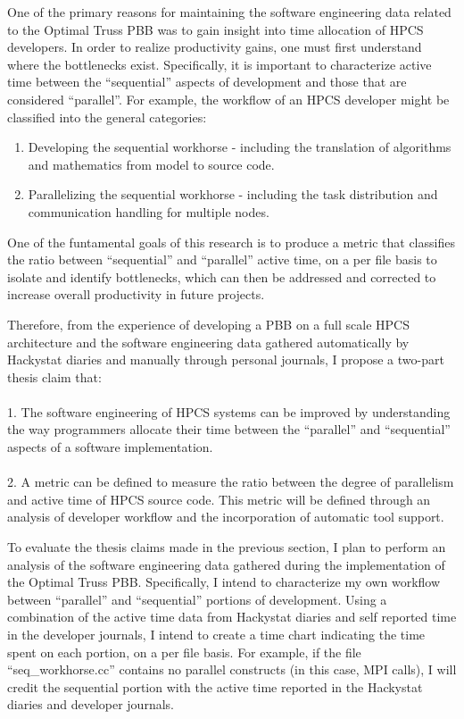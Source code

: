 \documentclass[11pt,twocolumn]{article}
\begin{document}
One of the primary reasons for maintaining the software engineering
data related to the Optimal Truss PBB was to gain insight into time
allocation of HPCS developers.  In order to realize productivity
gains, one must first understand where the bottlenecks exist.
Specifically, it is important to characterize active time between the
``sequential'' aspects of development and those that are considered
``parallel''.  For example, the workflow of an HPCS developer might be
classified into the general categories:

\begin{enumerate}
  \item Developing the sequential workhorse - including the translation of
algorithms and mathematics from model to source code.
  \item Parallelizing the sequential workhorse - including the task
distribution and communication handling for multiple nodes.
\end{enumerate}

One of the funtamental goals of this research is to produce a metric
that classifies the ratio between ``sequential'' and ``parallel''
active time, on a per file basis to isolate and identify bottlenecks,
which can then be addressed and corrected to increase overall
productivity in future projects.

Therefore, from the experience of developing a PBB on a full scale HPCS
architecture and the software engineering data gathered automatically
by Hackystat diaries and manually through personal journals, I propose
a two-part thesis claim that:
\\
\\
1. The software engineering of HPCS systems can be improved by
understanding the way programmers allocate their time between the
``parallel'' and ``sequential'' aspects of a software implementation.
\\
\\
2. A metric can be defined to measure the ratio between the degree of
parallelism and active time of HPCS source code.  This metric will be
defined through an analysis of developer workflow and the
incorporation of automatic tool support.

\label{sec:methodology}

To evaluate the thesis claims made in the previous section, I plan to
perform an analysis of the software engineering data gathered during
the implementation of the Optimal Truss PBB.  Specifically, I intend
to characterize my own workflow between ``parallel'' and
``sequential'' portions of development.  Using a combination of the
active time data from Hackystat diaries and self reported time in the
developer journals, I intend to create a time chart indicating the
time spent on each portion, on a per file basis.  For example, if the
file ``seq\_workhorse.cc'' contains no parallel constructs (in this
case, MPI calls), I will credit the sequential portion with the active
time reported in the Hackystat diaries and developer journals.
\end{document}

